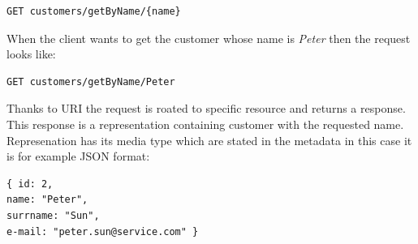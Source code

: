 
\begin{lstlisting}
GET customers/getByName/{name} 
\end{lstlisting}

When the client wants to get the customer whose name is \emph{Peter} then the request looks like:

\begin{lstlisting}
GET customers/getByName/Peter 
\end{lstlisting}

Thanks to URI the request is roated to specific resource and returns a response. This response is a representation containing customer with the requested name. Represenation has its media type which are stated in the metadata in this case it is for example JSON format:

\begin{lstlisting}
{ id: 2,
name: "Peter",
surrname: "Sun",
e-mail: "peter.sun@service.com" }
\end{lstlisting}




